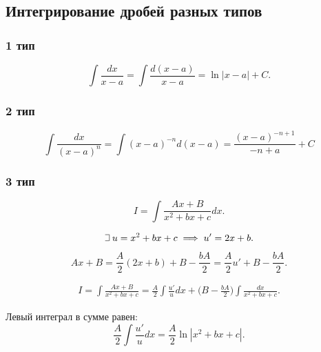 \documentclass[a4paper,12pt,oneside]{extbook}
\def\lets{%
    \mathord{\setbox0=\hbox{$\exists$}%
        \hbox{\kern 0.125\wd0%
            \vbox to \ht0{%
                \hrule width 0.75\wd0%
                \vfill%
                \hrule width 0.75\wd0}%
            \vrule height \ht0%
            \kern 0.125\wd0}%
    }%
    \hspace{2pt}
}
\theoremstyle{numbered}
\theoremstyle{unnumbered}
\theoremstyle{named}
\theoremstyle{unnumbered}
\theoremstyle{named}
\theoremstyle{named}
\theoremstyle{named}
\begin{document}
\subsection{Интегрирование дробей разных типов}%
\label{sub:Интегрирование дробей разных типов}

\subsubsection{1 тип}%
\label{ssub:1 тип}
\begin{equation}
    \int \frac{dx}{x - a} = \int \frac{d(x -a)}{x - a} = \ln |x - a| + C.
\end{equation}

\subsubsection{2 тип}%
\label{ssub:2 тип}
\begin{equation}
    \int \frac{dx}{(x - a)^n} = \int (x - a)^{-n} d(x -a) = \frac{(x - a)^{-n + 1}}{-n + a} + C
\end{equation}

\subsubsection{3 тип}%
\label{ssub:3 тип}

\begin{equation}
    I = \int \frac{Ax + B}{x^2 + bx + c}dx.
\end{equation}

\begin{equation}
    \lets u = x^2 + bx + c \implies u' = 2x + b.
\end{equation}

\begin{equation}
    Ax + B = \frac{A}{2} (2x + b) + B - \frac{bA}{2} = \frac{A}{2}u' + B - \frac{bA}{2}.
\end{equation}

\begin{equation}
    \begin{gathered}
        I = \int \frac{Ax + B}{x^2 + bx + c} =
        \frac{A}{2} \int \frac{u'}{u} dx + \Big( B - \frac{bA}{2} \Big) \int \frac{dx}{x^2 + bx + c}.
    \end{gathered}
\end{equation}

Левый интеграл в сумме равен:
\begin{equation}
    \frac{A}{2} \int \frac{u'}{u} dx = \frac{A}{2} \ln |x^2 + bx + c|.
\end{equation}
\end{document}
